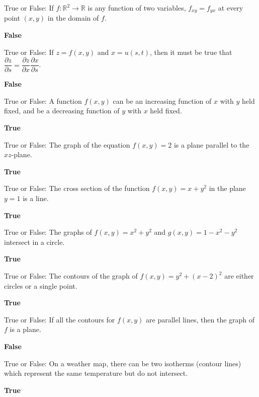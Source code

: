 \documentclass{exam}
\newcommand{\pdev}[2]{\dfrac{\partial {#1}}{\partial{#2}}}
\newcommand{\R}{\mathbb{R}}
\begin{document}
\begin{questions}
		\question True or False: If $f:\R^2\to \R$ is any function of two variables, $f_{xy}=f_{yx}$ at every point $(x,y)$ in the domain of $f$.
		 \begin{solution}
		 	\textbf{False}
		 \end{solution}
		
		\question True or False: If $z=f(x,y)$ and $x=u(s,t)$, then it must be true that $\pdev{z}{s}=\pdev{z}{x}\pdev{x}{s}$.
		 \begin{solution}
		 	\textbf{False}
		 \end{solution}
		
		\question True or False: A function $f(x, y)$ can be an increasing function of $x$ with $y$ held fixed, and be a
		decreasing function of $y$ with $x$	 held fixed.
		 \begin{solution}
		 	\textbf{True}
		 \end{solution}
		
		\question True or False: The graph of the equation $f(x, y) = 2$ is a plane parallel to the $xz$-plane.
		 \begin{solution}
		 	\textbf{True}
		 \end{solution}
		
		\question True or False: The cross section of the function $f(x, y) = x + y^2$ in the plane $y = 1$ is a line.
		 \begin{solution}
		 	\textbf{True}
		 \end{solution}
		
		\question True or False: The graphs of $f(x, y) = x^2 + y^2$ and $g(x, y) = 1 - x^2 - y^2$ intersect in a circle.
		 \begin{solution}
		 	\textbf{True}
		 \end{solution}
		
		\question True or False: The contours of the graph of $f(x, y) = y^2 + (x - 2)^2$ are either circles or a single point.
		 \begin{solution}
		 	\textbf{True}
		 \end{solution}
		
		\question True or False: If all the contours for $f(x, y)$ are parallel lines, then the graph of $f$ is a plane.
		 \begin{solution}
		 	\textbf{False}
		 \end{solution}
		
		\question True or False: On a weather map, there can be two isotherms (contour lines) which represent the same temperature but do not intersect.
		 \begin{solution}
		 	\textbf{True}
		 \end{solution}
		

\end{questions}
\end{document}
